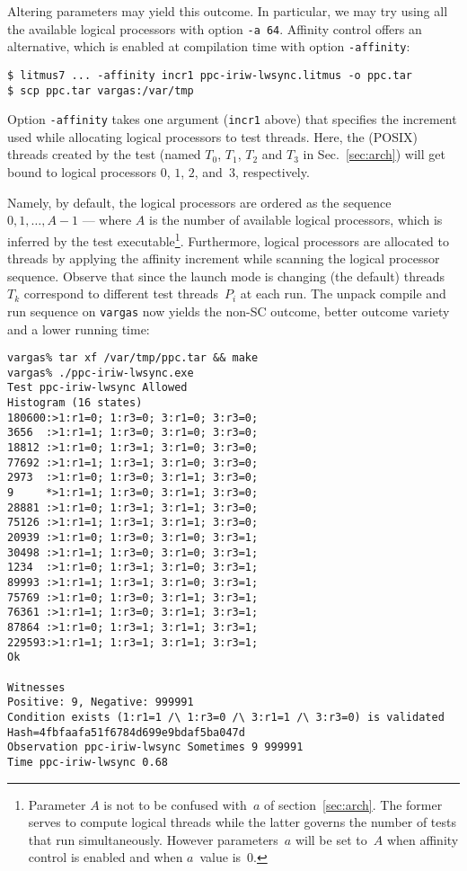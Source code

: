 Altering parameters may yield this outcome.
In particular, we may try using all the available logical processors
with option \texttt{-a 64}.
Affinity control offers an alternative, which is enabled at compilation time
with \litmus{} option \texttt{-affinity}:
\begin{verbatim}
$ litmus7 ... -affinity incr1 ppc-iriw-lwsync.litmus -o ppc.tar
$ scp ppc.tar vargas:/var/tmp
\end{verbatim}
Option \texttt{-affinity} takes one argument (\texttt{incr1} above)
that specifies the increment used while allocating
logical processors to test threads.
Here, the  (POSIX) threads created by the test
(named $T_0$, $T_1$, $T_2$ and $T_3$ in Sec.~\ref{sec:arch})
will get bound to logical processors
$0$, $1$, $2$, and~$3$, respectively.

\label{defi}Namely, by default, the logical processors are
ordered as the sequence $0, 1, \ldots, A-1$ ---
where $A$ is the number of available logical processors, which is
inferred by the test executable\footnote{Parameter $A$ is not to be confused with~$a$ of section~\ref{sec:arch}. The former  serves to compute logical threads while the latter governs the number of tests that run simultaneously. However
parameters~$a$ will be set to~$A$ when affinity control is enabled and when
$a$~value is~$0$.}.
Furthermore, logical processors are allocated to threads by
applying the affinity increment while scanning the logical processor sequence.
Observe that since the launch mode is changing (the default) threads
$T_k$ correspond to different test threads~$P_i$ at each run.
The unpack compile and run sequence on \texttt{vargas} now yields
the non-SC outcome, better outcome variety and a lower running time:
\begin{verbatim}
vargas% tar xf /var/tmp/ppc.tar && make
vargas% ./ppc-iriw-lwsync.exe
Test ppc-iriw-lwsync Allowed
Histogram (16 states)
180600:>1:r1=0; 1:r3=0; 3:r1=0; 3:r3=0;
3656  :>1:r1=1; 1:r3=0; 3:r1=0; 3:r3=0;
18812 :>1:r1=0; 1:r3=1; 3:r1=0; 3:r3=0;
77692 :>1:r1=1; 1:r3=1; 3:r1=0; 3:r3=0;
2973  :>1:r1=0; 1:r3=0; 3:r1=1; 3:r3=0;
9     *>1:r1=1; 1:r3=0; 3:r1=1; 3:r3=0;
28881 :>1:r1=0; 1:r3=1; 3:r1=1; 3:r3=0;
75126 :>1:r1=1; 1:r3=1; 3:r1=1; 3:r3=0;
20939 :>1:r1=0; 1:r3=0; 3:r1=0; 3:r3=1;
30498 :>1:r1=1; 1:r3=0; 3:r1=0; 3:r3=1;
1234  :>1:r1=0; 1:r3=1; 3:r1=0; 3:r3=1;
89993 :>1:r1=1; 1:r3=1; 3:r1=0; 3:r3=1;
75769 :>1:r1=0; 1:r3=0; 3:r1=1; 3:r3=1;
76361 :>1:r1=1; 1:r3=0; 3:r1=1; 3:r3=1;
87864 :>1:r1=0; 1:r3=1; 3:r1=1; 3:r3=1;
229593:>1:r1=1; 1:r3=1; 3:r1=1; 3:r3=1;
Ok

Witnesses
Positive: 9, Negative: 999991
Condition exists (1:r1=1 /\ 1:r3=0 /\ 3:r1=1 /\ 3:r3=0) is validated
Hash=4fbfaafa51f6784d699e9bdaf5ba047d
Observation ppc-iriw-lwsync Sometimes 9 999991
Time ppc-iriw-lwsync 0.68
\end{verbatim}



